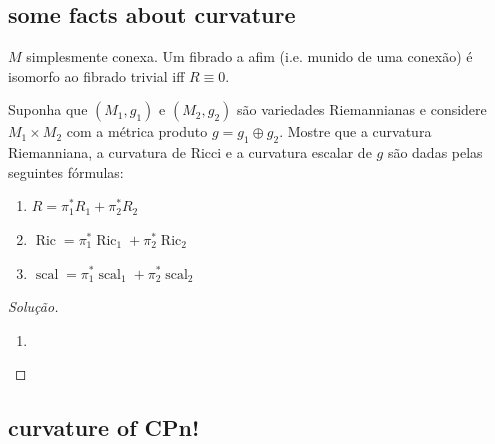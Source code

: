 \subsection{some facts about curvature}

\begin{claim}\leavevmode
\(M\) simplesmente conexa. Um fibrado a afim (i.e. munido de uma conexão) é isomorfo ao fibrado trivial iff \(R \equiv 0\).
\end{claim}



\begin{exercise}\leavevmode
Suponha que \((M_1,g_1)\) e \((M_2,g_2)\) são variedades Riemannianas e considere \(M_1\times M_2\) com a métrica produto \(g=g_1 \oplus  g_2\). Mostre que a curvatura Riemanniana, a curvatura de Ricci e a curvatura escalar de \(g\) são dadas pelas seguintes fórmulas:
\begin{enumerate}[label=(\alph*)]
\item \(R=\pi_1^*R_1+\pi_2^*R_2\)
\item \(\operatorname{Ric}=\pi_1^*\operatorname{Ric}_1+\pi_2^*\operatorname{Ric}_2\)
\item \(\operatorname{scal}=\pi_1^*\operatorname{scal}_1+\pi_2^*\operatorname{scal}_2\)
\end{enumerate}
\end{exercise}

\begin{proof}[Solução]\leavevmode
\begin{enumerate}[label=(\alph*)]
\item 
\end{enumerate}
\end{proof}

\subsection{curvature of CPn!}

